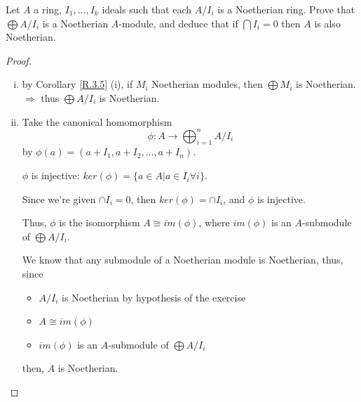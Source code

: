 \documentclass{article}
\theoremstyle{definition}
\newenvironment{ex}[1]
{\renewcommand\theinnerex{#1}\innerex}
{\endinnerex}
\begin{document}
\begin{ex}{R.3.3}
Let $A$ a ring, $I_1, \ldots, I_k$ ideals such that each $A/I_i$ is a Noetherian ring.
Prove that $\bigoplus A/I_i$ is a Noetherian $A$-module, and deduce that if $\bigcap I_i = 0$ then $A$ is also Noetherian.
\end{ex}
\begin{proof}
\begin{enumerate}[i.]
  \item by Corollary \ref{R.3.5} (i), if $M_i$ Noetherian modules, then $\bigoplus M_i$ is Noetherian.
    $\Longrightarrow$ thus $\bigoplus A/I_i$ is Noetherian.
  \item Take the canonical homomorphism
    $$\phi: A \longrightarrow \bigoplus_{i=1}^n A/ I_i$$
    by $\phi(a) = (a+I_1, a+I_2, \ldots, a+I_n)$.

    $\phi$ is injective: $ker(\phi)= \{ a \in A | a \in I_i \forall i \}$.

    Since we're given $\cap I_i = 0$, then $ker(\phi)=\cap I_i$, and $\phi$ is injective.

    Thus, $\phi$ is the isomorphism $A \cong im(\phi)$, where $im(\phi)$ is an $A$-submodule of $\bigoplus A/I_i$.

    We know that any submodule of a Noetherian module is Noetherian, thus, since
    \begin{itemize}
      \item $A/I_i$ is Noetherian by hypothesis of the exercise
      \item $A \cong im(\phi)$
      \item $im(\phi)$ is an $A$-submodule of $\bigoplus A/I_i$
  \end{itemize}
  then, $A$ is Noetherian.
\end{enumerate}
\end{proof}
\end{document}
